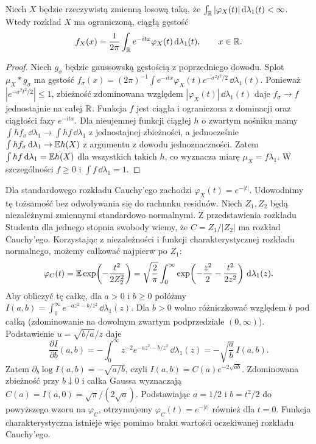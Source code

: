 \begin{stwierdzenie}
Niech $X$ będzie rzeczywistą zmienną losową taką,
że $\int_{\mathbb{R}}|\varphi_X(t)|\,\mathrm{d}\lambda_1(t)<\infty$.
Wtedy rozkład $X$ ma ograniczoną, ciągłą gęstość
\[
f_X(x)=\frac1{2\pi}\int_{\mathbb{R}} e^{-itx}\varphi_X(t)
\,\mathrm{d}\lambda_1(t),\qquad x\in\mathbb{R}.
\]
\end{stwierdzenie}
\begin{proof}
Niech $g_\sigma$ będzie gaussowską gęstością z
poprzedniego dowodu. Splot $\mu_X*g_\sigma$ ma gęstość
$f_\sigma(x)=(2\pi)^{-1}\int e^{-itx}\varphi_X(t)
 e^{-\sigma^2t^2/2}\,\dd\lambda_1(t)$.
Ponieważ $|e^{-\sigma^2t^2/2}|\leq1$, zbieżność zdominowana
względem $|\varphi_X(t)|\,\dd\lambda_1(t)$ daje
$f_\sigma\to f$ jednostajnie na całej $\mathbb{R}$.
Funkcja $f$ jest ciągła i ograniczona z dominacji
oraz ciągłości fazy $e^{-itx}$.
Dla nieujemnej funkcji ciągłej $h$ o zwartym nośniku
mamy $\int h f_\sigma\,\dd\lambda_1\to
\int h f\,\dd\lambda_1$ z jednostajnej zbieżności,
a jednocześnie $\int h f_\sigma\,\mathrm{d}\lambda_1\to\mathbb{E} h(X)$
z argumentu z dowodu jednoznaczności.
Zatem $\int h f\,\mathrm{d}\lambda_1=\mathbb{E} h(X)$
dla wszystkich takich $h$, co wyznacza miarę
$\mu_X=f\lambda_1$. W szczególności $f\geq0$
i $\int f\,\dd\lambda_1=1$.
\end{proof}

\begin{przyklad}
Dla standardowego rozkładu Cauchy'ego zachodzi
$\varphi_X(t)=e^{-|t|}$. Udowodnimy tę tożsamość
bez odwoływania się do rachunku residuów.
Niech $Z_1,Z_2$ będą niezależnymi zmiennymi standardowo
normalnymi. Z przedstawienia rozkładu Studenta dla
jednego stopnia swobody wiemy, że $C=Z_1/|Z_2|$
ma rozkład Cauchy'ego. Korzystając z niezależności
i funkcji charakterystycznej rozkładu normalnego,
możemy całkować najpierw po $Z_1$:
\[
\varphi_C(t)=\mathbb{E}\exp\!\left(-\frac{t^2}{2Z_2^2}\right)
=\sqrt{\frac2\pi}\int_0^\infty
\exp\!\left(-\frac{z^2}{2}-\frac{t^2}{2z^2}\right)
\,\mathrm{d}\lambda_1(z).
\]
Aby obliczyć tę całkę, dla $a>0$ i $b\geq0$ połóżmy
$I(a,b)=\int_0^\infty e^{-az^2-b/z^2}\,\dd\lambda_1(z)$.
Dla $b>0$ wolno różniczkować względem $b$ pod całką
(zdominowanie na dowolnym zwartym podprzedziale
$(0,\infty)$). Podstawienie $u=\sqrt{b/a}/z$ daje
\[
\frac{\partial I}{\partial b}(a,b)
=-\int_0^\infty z^{-2}e^{-az^2-b/z^2}\,\dd\lambda_1(z)
=-\sqrt{\frac ab}\,I(a,b).
\]
Zatem $\partial_b\log I(a,b)=-\sqrt{a/b}$,
czyli $I(a,b)=C(a)e^{-2\sqrt{ab}}$.
Zdominowana zbieżność przy $b\downarrow0$ i całka
Gaussa wyznaczają $C(a)=I(a,0)=\sqrt\pi/(2\sqrt a)$.
Podstawiając $a=1/2$ i $b=t^2/2$ do powyższego
wzoru na $\varphi_C$, otrzymujemy
$\varphi_C(t)=e^{-|t|}$ również dla $t=0$.
Funkcja charakterystyczna istnieje więc pomimo braku
wartości oczekiwanej rozkładu Cauchy'ego.
\end{przyklad}

